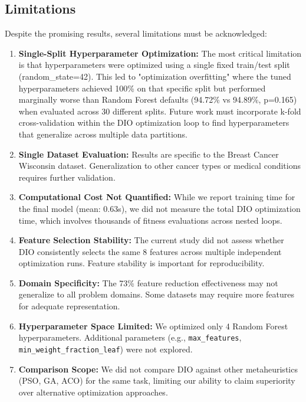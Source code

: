 \documentclass[12pt, a4paper]{article}
\begin{document}
\subsection{Limitations}
Despite the promising results, several limitations must be acknowledged:
\begin{enumerate}
    \item \textbf{Single-Split Hyperparameter Optimization:} The most critical limitation is that hyperparameters were optimized using a single fixed train/test split (random\_state=42). This led to "optimization overfitting" where the tuned hyperparameters achieved 100\% on that specific split but performed marginally worse than Random Forest defaults (94.72\% vs 94.89\%, p=0.165) when evaluated across 30 different splits. Future work must incorporate k-fold cross-validation within the DIO optimization loop to find hyperparameters that generalize across multiple data partitions.
    
    \item \textbf{Single Dataset Evaluation:} Results are specific to the Breast Cancer Wisconsin dataset. Generalization to other cancer types or medical conditions requires further validation.
    
    \item \textbf{Computational Cost Not Quantified:} While we report training time for the final model (mean: 0.63s), we did not measure the total DIO optimization time, which involves thousands of fitness evaluations across nested loops.
    
    \item \textbf{Feature Selection Stability:} The current study did not assess whether DIO consistently selects the same 8 features across multiple independent optimization runs. Feature stability is important for reproducibility.
    
    \item \textbf{Domain Specificity:} The 73\% feature reduction effectiveness may not generalize to all problem domains. Some datasets may require more features for adequate representation.
    
    \item \textbf{Hyperparameter Space Limited:} We optimized only 4 Random Forest hyperparameters. Additional parameters (e.g., \texttt{max\_features}, \texttt{min\_weight\_fraction\_leaf}) were not explored.
    
    \item \textbf{Comparison Scope:} We did not compare DIO against other metaheuristics (PSO, GA, ACO) for the same task, limiting our ability to claim superiority over alternative optimization approaches.
\end{enumerate}
\end{document}
